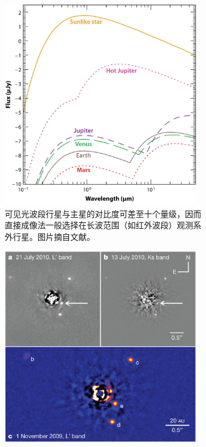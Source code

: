 \begin{figure}[h]
\centering
\begin{subfigure}[b]{.48\textwidth}
\captionsetup{width=0.9\textwidth}
\centering
\includegraphics[width=0.95\textwidth]{figures/chapter1/fig8a_dicontrast.jpg}
\caption[仪器接受类太阳恒星在 10 pc 以外的黑体辐射（黄色实线），其余为太阳系行星与热木星在此恒星周围黑体发射与发射的叠加流量。在可见光波段行星与主星的对比度可差至十个量级，因此直接成像法一般选择在长波范围（如红外波段）探测系外行星。图片版权 Seager and Deming。]{可见光波段行星与主星的对比度可差至十个量级，因而直接成像法一般选择在长波范围（如红外波段）观测系外行星。图片摘自文献。}
\label{fig:contrast}
\end{subfigure}
\begin{subfigure}[b]{.48\textwidth}
\captionsetup{width=0.9\textwidth}
\centering
\includegraphics[width=0.95\textwidth]{figures/chapter1/fig8b_hr8799.jpg}

\end{subfigure}
\end{figure}

